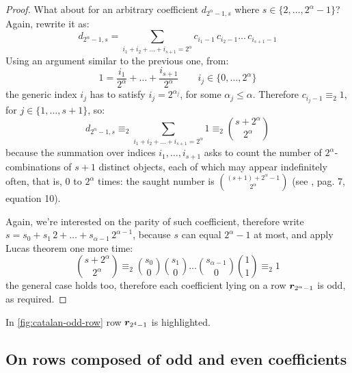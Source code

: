 \begin{proof}
    What about for an arbitrary coefficient $d_{2^{\alpha}-1,s}$ where
    $s\in\lbrace{2,\ldots,2^{\alpha}-1}\rbrace$?  Again, rewrite it as:
    \begin{displaymath}
        d_{2^{\alpha}-1,s} = \sum_{i_{1}+i_{2}+\ldots+i_{s+1}=2^{\alpha}}
            {c_{i_{1}-1}\,c_{i_{2}-1}\ldots\,c_{i_{s+1}-1}}
    \end{displaymath}
    Using an argument similar to the previous one, from:
    \begin{displaymath}
        1 = \frac{i_{1}}{2^{\alpha}}+\ldots+\frac{i_{s+1}}{2^{\alpha}} \qquad 
            i_{j}\in\lbrace 0,\ldots,2^{\alpha}\rbrace
    \end{displaymath} 
    the generic index $i_{j}$ has to satisfy $i_{j}=2^{\alpha_{j}}$, for some
    $\alpha_{j}\leq\alpha$. Therefore $c_{i_{j}-1}\equiv_{2}1$,
    for $j\in\lbrace1,\ldots,s+1\rbrace$, so:
    \begin{displaymath}
        d_{2^{\alpha}-1,s} \equiv_{2} \sum_{i_{1}+i_{2}+\ldots+i_{s+1}=2^{\alpha}}{1}
            \equiv_{2} {{s+2^{\alpha}}\choose{2^{\alpha}}}
    \end{displaymath}
    because the summation over indices $i_{1},\ldots,i_{s+1}$ asks to count the
    number of $2^{\alpha}$-combinations of $s+1$ distinct objects, each of
    which may appear indefinitely often, that is, $0$ to $2^{\alpha}$ times:
    the saught number is ${{(s+1)+2^{\alpha}-1}\choose{2^{\alpha}}}$
    (see \cite{riordan:intro:combinatorial:analysis}, pag. 7, equation 10).

    Again, we're interested on the parity of such coefficient, therefore
    write $s=s_{0}+s_{1}\,2+\ldots+s_{\alpha-1}\,2^{\alpha-1}$, because $s$ can equal 
    $2^{\alpha}-1$ at most, and apply Lucas theorem one more time:
    \begin{displaymath}
        {{s+2^{\alpha}}\choose{2^{\alpha}}}\equiv_{2} 
            {{s_{0}}\choose{0}}{{s_{1}}\choose{0}} \ldots
                {{s_{\alpha-1}}\choose{0}}{{1}\choose{1}}\equiv_{2}1 
    \end{displaymath}
    the general case holds too, therefore each coefficient lying on
    a row $\boldsymbol{r}_{2^{\alpha}-1}$ is odd, as required.
\end{proof}


In \autoref{fig:catalan-odd-row} row $\boldsymbol{r}_{2^{4}-1}$ is highlighted.

\subsection{On rows composed of odd and even coefficients}


